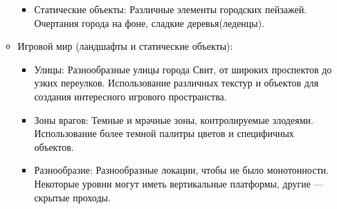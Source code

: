 \documentclass[article,12pt, fleqn]{article}
\begin{document}
\begin{itemize}
\begin{itemize}
\begin{itemize}
        \item Статические объекты: Различные элементы городских пейзажей. Очертания города на фоне, сладкие деревья(леденцы).
         \begin{figure}[ht]
            \centering
            \begin{minipage}[b]{0.3\textwidth}
            \end{minipage}\hfill
            \begin{minipage}[b]{0.3\textwidth}
            \end{minipage}
            \caption{}
        \end{figure}
    \end{itemize}
    \item Игровой мир (ландшафты и статические объекты):
    \begin{itemize}
        \item Улицы: Разнообразные улицы города Свит, от широких проспектов до узких переулков. Использование различных текстур и объектов для создания интересного игрового пространства.
        \item Зоны врагов: Темные и мрачные зоны, контролируемые злодеями. Использование более темной палитры цветов и специфичных объектов.
        \begin{figure}[ht]
            \centering
            \begin{minipage}[b]{0.3\textwidth}
            \end{minipage}\hfill
            \begin{minipage}[b]{0.3\textwidth}
            \end{minipage}
            \caption{}
        \end{figure}
        \item Разнообразие: Разнообразные локации, чтобы не было монотонности. Некоторые уровни могут иметь вертикальные платформы, другие — скрытые проходы.
        \begin{figure}[ht]
            \centering
            \begin{minipage}[b]{0.3\textwidth}
            \end{minipage}\hfill
            \begin{minipage}[b]{0.3\textwidth}
            \end{minipage}
            \caption{}
        \end{figure}
    \end{itemize}
\end{itemize}

\end{itemize}
\end{document}
